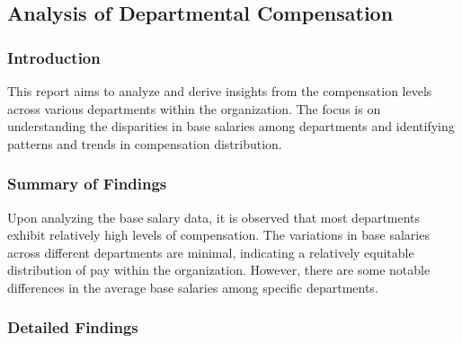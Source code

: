 \documentclass[
]{article}
\begin{document}
\subsection{Analysis of Departmental
Compensation}\label{analysis-of-departmental-compensation}

\subsubsection{Introduction}\label{introduction}

This report aims to analyze and derive insights from the compensation
levels across various departments within the organization. The focus is
on understanding the disparities in base salaries among departments and
identifying patterns and trends in compensation distribution.

\subsubsection{Summary of Findings}\label{summary-of-findings}

Upon analyzing the base salary data, it is observed that most
departments exhibit relatively high levels of compensation. The
variations in base salaries across different departments are minimal,
indicating a relatively equitable distribution of pay within the
organization. However, there are some notable differences in the average
base salaries among specific departments.

\subsubsection{Detailed Findings}\label{detailed-findings}
\end{document}
